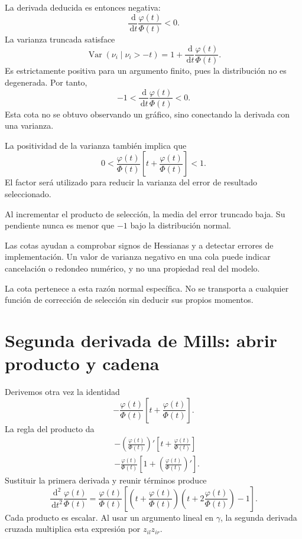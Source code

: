 \documentclass[11pt,a4paper]{article}
\newcommand{\dd}{\,\mathrm d}
\DeclareMathOperator{\Var}{Var}
\begin{document}
La derivada deducida es entonces negativa:
\[
\frac{\dd}{\dd t}\frac{\varphi(t)}{\Phi(t)}<0.
\]
La varianza truncada satisface
\[
\Var(\nu_i\mid\nu_i>-t)
=1+\frac{\dd}{\dd t}\frac{\varphi(t)}{\Phi(t)}.
\]
Es estrictamente positiva para
un argumento finito, pues la
distribución no es degenerada.
Por tanto,
\[
-1<
\frac{\dd}{\dd t}\frac{\varphi(t)}{\Phi(t)}
<0.
\]
Esta cota no se obtuvo observando
un gráfico, sino conectando
la derivada con una varianza.

La positividad de la varianza
también implica que
\[
0<
\frac{\varphi(t)}{\Phi(t)}
\left[t+\frac{\varphi(t)}{\Phi(t)}\right]
<1.
\]
El factor será utilizado
para reducir la varianza del
error de resultado seleccionado.

\begin{ejemplo}
Al incrementar el producto de selección,
la media del error truncado baja.
Su pendiente nunca es menor que \(-1\)
bajo la distribución normal.
\end{ejemplo}
Las cotas ayudan a comprobar
signos de Hessianas y a detectar
errores de implementación.
Un valor de varianza negativo
en una cola puede indicar
cancelación o redondeo numérico,
y no una propiedad real del modelo.

La cota pertenece a esta
razón normal específica.
No se transporta a cualquier
función de corrección de selección
sin deducir sus propios momentos.

\clearpage
\section{Segunda derivada de Mills: abrir producto y cadena}\label{unidad72}
Derivemos otra vez la identidad
\[
-\frac{\varphi(t)}{\Phi(t)}
\left[t+\frac{\varphi(t)}{\Phi(t)}\right].
\]
La regla del producto da
\[
\begin{aligned}
&-\left(\frac{\varphi(t)}{\Phi(t)}\right)'
\left[t+\frac{\varphi(t)}{\Phi(t)}\right]\\
&-\frac{\varphi(t)}{\Phi(t)}
\left[1+\left(\frac{\varphi(t)}{\Phi(t)}\right)'\right].
\end{aligned}
\]
Sustituir la primera derivada
y reunir términos produce
\[
\boxed{
\frac{\dd^2}{\dd t^2}\frac{\varphi(t)}{\Phi(t)}
=\frac{\varphi(t)}{\Phi(t)}
\left[
\left(t+\frac{\varphi(t)}{\Phi(t)}\right)
\left(t+2\frac{\varphi(t)}{\Phi(t)}\right)-1
\right]}.
\]
Cada producto es escalar.
Al usar un argumento lineal en \(\gamma\),
la segunda derivada cruzada multiplica
esta expresión por \(z_{il}z_{ir}\).
\end{document}
